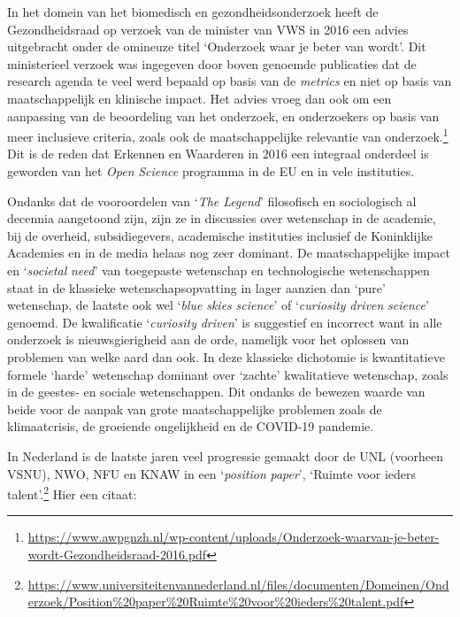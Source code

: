 \documentclass[smallauthor, chapterhaspagenum, nochapterinheader, pagenuminheader,  bigchapnum,medium2, tocpages, garamond, titleinheader]{jote-book}
\begin{document}
	In het domein van het biomedisch en gezondheidsonderzoek heeft de Gezondheidsraad op verzoek van de minister van VWS in 2016 een advies uitgebracht onder de omineuze titel ‘Onderzoek waar je beter van wordt'. Dit ministerieel verzoek was ingegeven door boven genoemde publicaties dat de research agenda te veel werd bepaald op basis van de \emph{metrics} en niet op basis van maatschappelijk en klinische impact. Het advies vroeg dan ook om een aanpassing van de beoordeling van het onderzoek, en onderzoekers op basis van meer inclusieve criteria, zoals ook de maatschappelijke relevantie van onderzoek.\footnote{\href{https://www.awpgnzh.nl/wp-content/uploads/Onderzoek-waarvan-je-beter-wordt-Gezondheidsraad-2016.pdf}{https://www.awpgnzh.nl/wp-content/uploads/Onderzoek-waarvan-je-beter-wordt-Gezondheidsraad-2016.pdf} } Dit is de reden dat Erkennen en Waarderen in 2016 een integraal onderdeel is geworden van het \emph{Open }\emph{Science} programma in de EU en in vele instituties.



	Ondanks dat de vooroordelen van ‘\emph{The Legend}' filosofisch en sociologisch al decennia aangetoond zijn, zijn ze in discussies over wetenschap in de academie, bij de overheid, subsidiegevers, academische instituties inclusief de Koninklijke Academies en in de media helaas nog zeer dominant. De maatschappelijke impact en ‘\emph{societal}\emph{ }\emph{need}' van toegepaste wetenschap en technologische wetenschappen staat in de klassieke wetenschapsopvatting in lager aanzien dan ‘pure' wetenschap, de laatste ook wel ‘\emph{blue }\emph{skies}\emph{ }\emph{science}' of ‘\emph{curiosity}\emph{ }\emph{driven}\emph{ }\emph{science}' genoemd. De kwalificatie ‘\emph{curiosity}\emph{ }\emph{driven}' is suggestief en incorrect want in alle onderzoek is nieuwsgierigheid aan de orde, namelijk voor het oplossen van problemen van welke aard dan ook. In deze klassieke dichotomie is kwantitatieve formele ‘harde' wetenschap dominant over ‘zachte' kwalitatieve wetenschap, zoals in de geestes- en sociale wetenschappen. Dit ondanks de bewezen waarde van beide voor de aanpak van grote maatschappelijke problemen zoals de klimaatcrisis, de groeiende ongelijkheid en de COVID-19 pandemie.



	In Nederland is de laatste jaren veel progressie gemaakt door de UNL (voorheen VSNU), NWO, NFU en KNAW in een ‘\emph{position}\emph{ paper}', ‘Ruimte voor ieders talent'.\footnote{\href{https://www.universiteitenvannederland.nl/files/documenten/Domeinen/Onderzoek/Position\%20paper\%20Ruimte\%20voor\%20ieders\%20talent.pdf}{https://www.universiteitenvannederland.nl/files/documenten/Domeinen/Onderzoek/Position\%20paper\%20Ruimte\%20voor\%20ieders\%20talent.pdf}} Hier een citaat:
\end{document}
